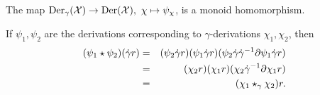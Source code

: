 \begin{lem} \label{lem:wgamma-to-w} 
The map $\mathrm{Der}_{\gamma}(\mathcal{X}) \to \mathrm{Der}(\mathcal{X}),~ \chi \mapsto \psi_{\chi}$, 
is a monoid homomorphism. 
\end{lem} 
\begin{pf} 
If $\psi_1,\psi_2$ are the derivations corresponding to $\gamma$-derivations 
$\chi_1,\chi_2$, then 
\begin{eqnarray*}
(\psi_1 \star \psi_2)(\dot{\gamma} r)
  &=& (\psi_2\dot{\gamma} r)(\psi_1\dot{\gamma} r)(\psi_2\dot{\gamma}\dot{\gamma}^{-1}\partial\psi_1\dot{\gamma} r) \\
  &=& (\chi_2 r)(\chi_1 r)(\chi_2\dot{\gamma}^{-1}\partial\chi_1 r) \\
  &=& (\chi_1 \star_{\gamma} \chi_2)r.
\end{eqnarray*}
\end{pf} 



